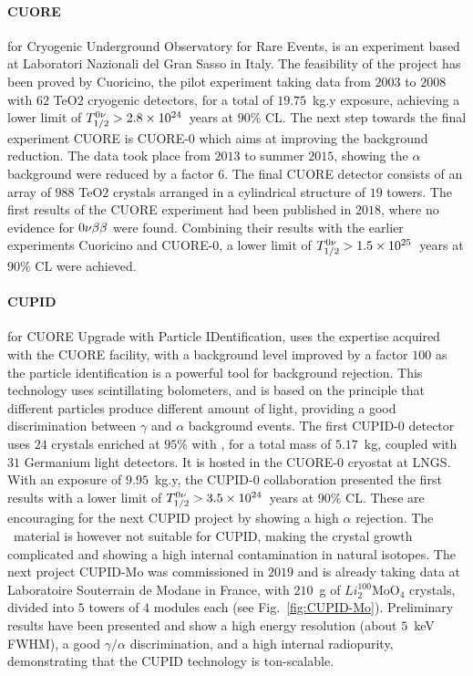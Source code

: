 \paragraph{CUORE} for Cryogenic Underground Observatory for Rare Events, is an experiment based at Laboratori Nazionali del Gran Sasso in Italy.
The feasibility of the project has been proved by Cuoricino, the pilot experiment taking data from $2003$ to $2008$ with $62$ TeO$2$ cryogenic detectors, for a total of $19.75$~kg.y exposure, achieving a lower limit of $T_{1/2}^{0\nu}>2.8\times 10^{24}$~years at $90$\% CL.
The next step towards the final experiment CUORE is CUORE-$0$ which aims at improving the background reduction.
The data took place from $2013$ to summer $2015$, showing the $\alpha$ background were reduced by a factor $6$.
The final CUORE detector consists of an array of $988$ TeO$2$ crystals arranged in a cylindrical structure of $19$ towers.
The first results of the CUORE experiment had been published in $2018$, where no evidence for $0\nu\beta\beta$ were found.
Combining their results with the earlier experiments Cuoricino and CUORE-$0$, a lower limit of $T_{1/2}^{0\nu}>1.5\times 10^{25}$~years at $90$\% CL were achieved.



\paragraph{CUPID} for CUORE Upgrade with Particle IDentification, uses the expertise acquired with the CUORE facility, with a background level improved by a factor $100$ as the particle identification is a powerful tool for background rejection.
This technology uses scintillating bolometers, and is based on the principle that different particles produce different amount of light, providing a good discrimination between $\gamma$ and $\alpha$ background events.
The first CUPID-$0$ detector uses $24$ crystals enriched at $95$\% with \Se, for a total mass of $5.17$~kg, coupled with $31$ Germanium light detectors.
It is hosted in the CUORE-$0$ cryostat at LNGS.
With an exposure of $9.95$~kg.y, the CUPID-$0$ collaboration presented the first results with a lower limit of $T_{1/2}^{0\nu}>3.5\times 10^{24}$~years at $90$\% CL.
These are encouraging for the next CUPID project by showing a high $\alpha$ rejection.
The \Se\ material is however not suitable for CUPID, making the crystal growth complicated and showing a high internal contamination in natural isotopes.
The next project CUPID-Mo was commissioned in $2019$ and is already taking data at Laboratoire Souterrain de Modane in France, with $210$~g of $Li_2^{100}$MoO$_4$ crystals, divided into $5$ towers of $4$ modules each (see Fig.~\ref{fig:CUPID-Mo}).
Preliminary results have been presented and show a high energy resolution (about $5$~keV FWHM), a good $\gamma/\alpha$ discrimination, and a high internal radiopurity, demonstrating that the CUPID technology is ton-scalable.

